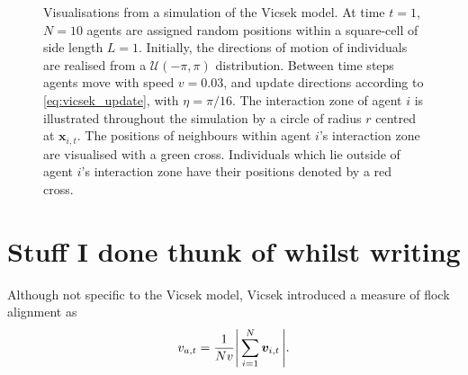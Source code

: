 \begin{figure}[tb]
    \caption{Visualisations from a simulation of the Vicsek model. At time $t=1$, $N=10$
        agents are assigned random positions within a square-cell of side length $L=1$.
        Initially, the directions of motion of individuals are realised from a
        $\mathcal{U}(-\pi, \pi)$ distribution. Between time steps agents move with speed
        $v=0.03$, and update directions according to \cref{eq:vicsek_update}, with
        $\eta=\pi/16$. The interaction zone of agent $i$ is illustrated throughout the
        simulation by a circle of radius $r$ centred at $\bm{x}_{i,t}$. The positions of
        neighbours within agent $i$'s interaction zone are visualised with a green cross.
        Individuals which lie outside of agent $i$'s interaction zone have their positions
        denoted by a red cross.}
\end{figure}

\section{Stuff I done thunk of whilst writing}

Although not specific to the Vicsek model, Vicsek introduced a measure of flock
alignment as 
\begin{equation}
    v_{a,t} = \frac{1}{Nv} \abs{\,\sum_{i=1}^N \bm{v}_{i,t}\,}.
\end{equation}



